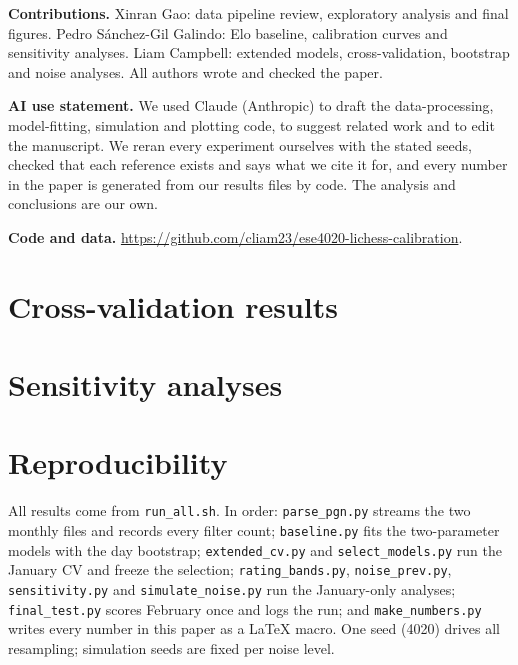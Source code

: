 \documentclass{article}
\begin{document}
\begin{ack}
\textbf{Contributions.} Xinran Gao: data pipeline review, exploratory analysis and final figures. Pedro S\'anchez-Gil Galindo: Elo baseline, calibration curves and sensitivity analyses. Liam Campbell: extended models, cross-validation, bootstrap and noise analyses. All authors wrote and checked the paper.

\textbf{AI use statement.} We used Claude (Anthropic) to draft the data-processing, model-fitting, simulation and plotting code, to suggest related work and to edit the manuscript. We reran every experiment ourselves with the stated seeds, checked that each reference exists and says what we cite it for, and every number in the paper is generated from our results files by code. The analysis and conclusions are our own.

\textbf{Code and data.} \url{https://github.com/cliam23/ese4020-lichess-calibration}.
\end{ack}




\appendix

\section{Cross-validation results}
\label{app:cv}


\section{Sensitivity analyses}
\label{app:sens}


\section{Reproducibility}
All results come from \texttt{run\_all.sh}. In order: \texttt{parse\_pgn.py} streams the two monthly files and records every filter count; \texttt{baseline.py} fits the two-parameter models with the day bootstrap; \texttt{extended\_cv.py} and \texttt{select\_models.py} run the January CV and freeze the selection; \texttt{rating\_bands.py}, \texttt{noise\_prev.py}, \texttt{sensitivity.py} and \texttt{simulate\_noise.py} run the January-only analyses; \texttt{final\_test.py} scores February once and logs the run; and \texttt{make\_numbers.py} writes every number in this paper as a LaTeX macro. One seed (4020) drives all resampling; simulation seeds are fixed per noise level.
\end{document}
